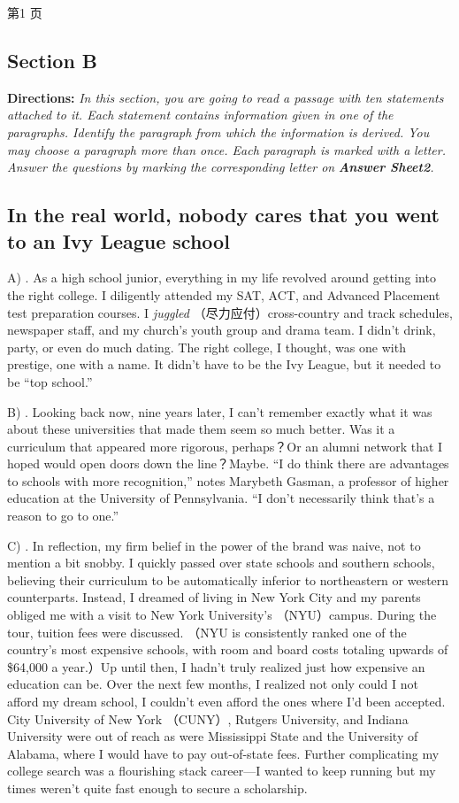 \documentclass[UTF8,11pt]{ctexart}
\begin{document}
第1 页


\subsection*{\textbf{Section B}}


\textbf{Directions:}\textit{ In this section, you are going to read a passage with ten statements attached to it. Each} \textit{statement contains information given in one of the paragraphs. Identify the paragraph from which the} \textit{information is derived. You may choose a paragraph more than once. Each paragraph is marked with a} \textit{letter. Answer the questions by marking the corresponding letter on}\textbf{\textit{ Answer Sheet2}}\textit{.}


\subsection*{\textbf{In the real world, nobody cares that you went to an Ivy League school}}


A) . As a high school junior, everything in my life revolved around getting into the right college. I diligently attended my SAT, ACT, and Advanced Placement test preparation courses. I\textit{ juggled} （尽力应付）cross-country and track schedules, newspaper staff, and my church’s youth group and drama team. I didn’t drink, party, or even do much dating. The right college, I thought, was one with prestige, one with a name. It didn’t have to be the Ivy League, but it needed to be “top school.”


B) . Looking back now, nine years later, I can’t remember exactly what it was about these universities that made them seem so much better. Was it a curriculum that appeared more rigorous, perhaps？Or an alumni network that I hoped would open doors down the line？Maybe. “I do think there are advantages to schools with more recognition,” notes Marybeth Gasman, a professor of higher education at the University of Pennsylvania. “I don’t necessarily think that’s a reason to go to one.”


C) . In reflection, my firm belief in the power of the brand was naive, not to mention a bit snobby. I quickly passed over state schools and southern schools, believing their curriculum to be automatically inferior to northeastern or western counterparts. Instead, I dreamed of living in New York City and my parents obliged me with a visit to New York University’s （NYU）campus. During the tour, tuition fees were discussed. （NYU is consistently ranked one of the country’s most expensive schools, with room and board costs totaling upwards of \$64,000 a year.）Up until then, I hadn’t truly realized just how expensive an education can be. Over the next few months, I realized not only could I not afford my dream school, I couldn’t even afford the ones where I’d been accepted. City University of New York （CUNY）, Rutgers University, and Indiana University were out of reach as were Mississippi State and the University of Alabama, where I would have to pay out-of-state fees. Further complicating my college search was a flourishing stack career—I wanted to keep running but my times weren’t quite fast enough to secure a scholarship.
\end{document}

